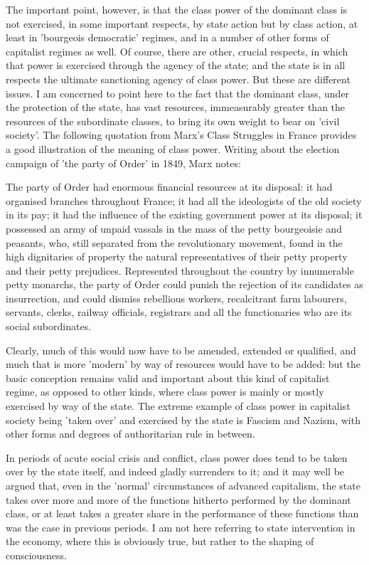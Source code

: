 The important point, however, is that the class power of the dominant class is not exercised, in some important respects, by state action but by class action, at least in 'bourgeois democratic' regimes, and in a number of other forms of capitalist regimes as well. Of course, there are other, crucial respects, in which that power is exercised through the agency of the state; and the state is in all respects the ultimate sanctioning agency of class power. But these are different issues. I am concerned to point here to the fact that the dominant class, under the protection of the state, has vast resources, immeasurably greater than the resources of the subordinate classes, to bring its own weight to bear on 'civil society'. The following quotation from Marx's Class Struggles in France provides a good illustration of the meaning of class power. Writing about the election campaign of 'the party of Order' in 1849, Marx notes:
\begin{displayquote}
    The party of Order had enormous financial resources at its disposal: it had organised branches throughout France; it had all the ideologists of the old society in its pay; it had the influence of the existing government power at its disposal; it possessed an army of unpaid vassals in the mass of the petty bourgeoisie and peasants, who, still separated from the revolutionary movement, found in the high dignitaries of property the natural representatives of their petty property and their petty prejudices. Represented throughout the country by innumerable petty monarchs, the party of Order could punish the rejection of its candidates as insurrection, and could dismiss rebellious workers, recalcitrant farm labourers, servants, clerks, railway officials, registrars and all the functionaries who are its social subordinates.
\end{displayquote}

Clearly, much of this would now have to be amended, extended or qualified, and much that is more 'modern' by way of resources would have to be added: but the basic conception remains valid and important about this kind of capitalist regime, as opposed to other kinds, where class power is mainly or mostly exercised by way of the state. The extreme example of class power in capitalist society being 'taken over' and exercised by the state is Fascism and Nazism, with other forms and degrees of authoritarian rule in between.

In periods of acute social crisis and conflict, class power does tend to be taken over by the state itself, and indeed gladly surrenders to it; and it may well be argued that, even in the 'normal' circumstances of advanced capitalism, the state takes over more and more of the functions hitherto performed by the dominant class, or at least takes a greater share in the performance of these functions than was the case in previous periods. I am not here referring to state intervention in the economy, where this is obviously true, but rather to the shaping of consciousness.


